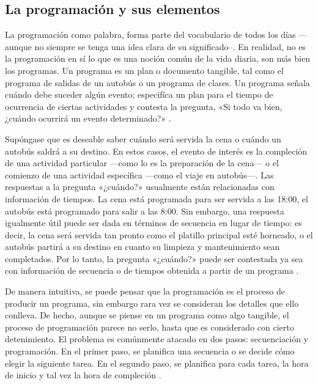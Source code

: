 \documentclass[draft,12pt,headsepline,footsepline,paper=letter]{scrreprt}
\begin{document}
\subsection{La programación y sus elementos} %
\label{sub:programacion_elementos}

La programación como palabra, forma parte del vocabulario de todos los días —aunque no siempre se tenga una idea clara de su significado–. En realidad, no es la programación en sí lo que es una noción común de la vida diaria, son más bien los programas. Un programa es un plan o documento tangible, tal como el programa de salidas de un autobús o un programa de clases. Un programa señala cuándo debe suceder algún evento; especifíca un plan para el tiempo de ocurrencia de ciertas actividades y contesta la pregunta, «Si todo va bien, ¿cuándo ocurrirá un evento determinado?» \cite[p.~1]{Baker2009}.

Supóngase que es deseable saber cuándo será servida la cena o cuándo un autobús saldrá a su destino. En estos casos, el evento de interés es la compleción de una actividad particular —como lo es la preparación de la cena— o el comienzo de una actividad específica —como el viaje en autobús—. Las respuestas a la pregunta «¿cuándo?» usualmente están relacionadas con información de tiempos. La cena está programada para ser servida a las 18:00, el autobús está programado para salir a las 8:00. Sin embargo, una respuesta igualmente útil puede ser dada en términos de secuencia en lugar de tiempo: es decir, la cena será servida tan pronto como el platillo principal esté horneado, o el autobús partirá a su destino en cuanto su limpieza y mantenimiento sean completados. Por lo tanto, la pregunta «¿cuándo?» puede ser contestada ya sea con información de secuencia o de tiempos obtenida a partir de un programa \citep[p.~1]{Baker2009}.

De manera intuitiva, se puede pensar que la programación es el proceso de producir un programa, sin embargo rara vez se consideran los detalles que ello conlleva. De hecho, aunque se piense en un programa como algo tangible, el proceso de programación parece no serlo, hasta que es considerado con cierto detenimiento. El problema es comúnmente atacado en dos pasos: secuenciación y programación. En el primer paso, se planifica una secuencia o se decide cómo elegir la siguiente tarea. En el segundo paso, se planifica para cada tarea, la hora de inicio y tal vez la hora de compleción \citep[p.~2]{Baker2009}.
\end{document}
